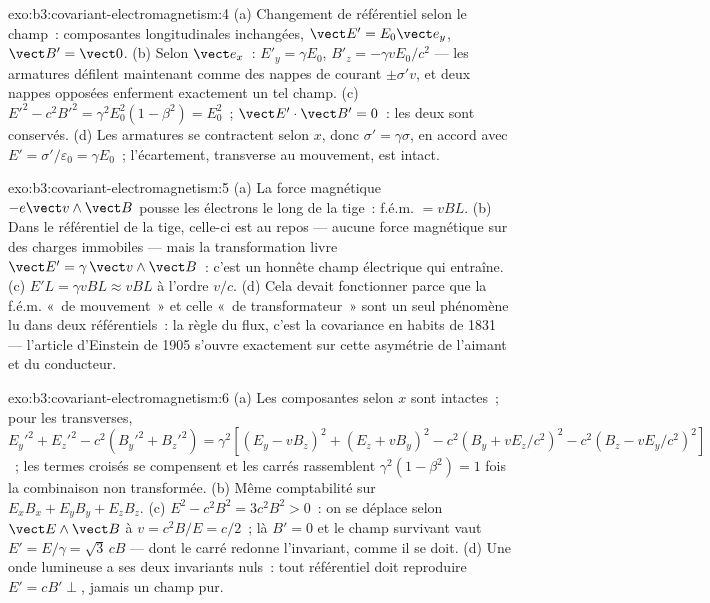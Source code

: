 \begin{solution}{exo:b3:covariant-electromagnetism:4}
(a) Changement de référentiel selon le champ~: composantes
longitudinales inchangées, $\vect
E' = E_0\vect e_y$, $\vect B' = \vect 0$. (b) Selon $\vect
e_x$~: $E'_y = \gamma E_0$, $B'_z = -\gamma vE_0/c^2$ --- les armatures
défilent maintenant comme des nappes de courant $\pm\sigma'v$, et deux
nappes opposées enferment exactement un tel champ. (c) $E'^2 - c^2B'^2 =
\gamma^2E_0^2(1 - \beta^2) = E_0^2$~; $\vect E'\cdot\vect B' = 0$~:
les deux sont conservés. (d) Les armatures se contractent selon $x$, donc $\sigma' =
\gamma\sigma$, en accord avec $E' = \sigma'/\varepsilon_0 = \gamma
E_0$~; l'écartement, transverse au mouvement, est intact.
\end{solution}

\begin{solution}{exo:b3:covariant-electromagnetism:5}
(a) La force magnétique $-e\vect v\wedge\vect B$ pousse les électrons
le long de la tige~: f.é.m. $= vBL$. (b) Dans le référentiel de la
tige, celle-ci est au repos --- aucune force magnétique sur des
charges immobiles --- mais la transformation livre
$\vect E' = \gamma\,\vect v\wedge\vect B$~: c'est un honnête champ
électrique qui entraîne. (c) $E'L = \gamma vBL
\approx vBL$ à l'ordre $v/c$. (d) Cela devait fonctionner parce que la
f.é.m. «~de mouvement~» et celle «~de transformateur~» sont un seul
phénomène lu dans deux référentiels~: la règle du flux, c'est la
covariance en habits de 1831 --- l'article d'Einstein de 1905 s'ouvre
exactement sur cette asymétrie de l'aimant et du conducteur.
\end{solution}

\begin{solution}{exo:b3:covariant-electromagnetism:6}
(a) Les composantes selon $x$ sont intactes~; pour les transverses,
$E_y'^2 + E_z'^2 - c^2(B_y'^2 + B_z'^2) = \gamma^2[(E_y - vB_z)^2 +
(E_z + vB_y)^2 - c^2(B_y + vE_z/c^2)^2 - c^2(B_z - vE_y/c^2)^2]$~;
les termes croisés se compensent et les carrés rassemblent $\gamma^2(1 -
\beta^2) = 1$ fois la combinaison non transformée. (b) Même
comptabilité sur $E_xB_x + E_yB_y + E_zB_z$. (c) $E^2 - c^2B^2 =
3c^2B^2 > 0$~: on se déplace selon $\vect E\wedge\vect B$ à $v = c^2B/E =
c/2$~; là $B' = 0$ et le champ survivant vaut $E' = E/\gamma =
\sqrt3\,cB$ --- dont le carré redonne l'invariant, comme il se doit. (d) Une onde lumineuse a ses deux invariants
nuls~: tout référentiel doit reproduire $E' = cB' \perp$, jamais un champ pur.
\end{solution}

